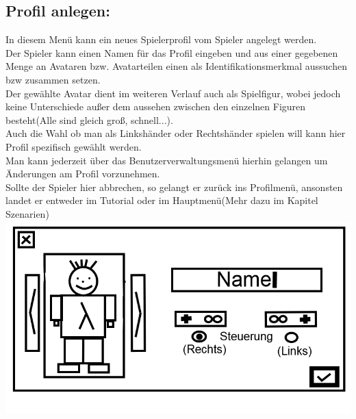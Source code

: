 \documentclass{scrartcl}
\begin{document}
\begin{enumerate}
	\begin{minipage}{1\textwidth}
		\item \subsection*{Profil anlegen:}
		In diesem Menü kann ein neues Spielerprofil vom Spieler angelegt werden.\\
		Der Spieler kann einen Namen für das Profil eingeben und aus einer gegebenen Menge an Avataren bzw. Avatarteilen einen als Identifikationsmerkmal aussuchen bzw zusammen setzen.\\
		Der gewählte Avatar dient im weiteren Verlauf auch als Spielfigur, wobei jedoch keine Unterschiede außer dem aussehen zwischen den einzelnen Figuren besteht(Alle sind gleich groß, schnell...).\\
		Auch die Wahl ob man als Linkshänder oder Rechtshänder spielen will kann hier Profil spezifisch gewählt werden.\\
		Man kann jederzeit über das Benutzerverwaltungsmenü hierhin gelangen um Änderungen am Profil vorzunehmen.\\
		Sollte der Spieler hier abbrechen, so gelangt er zurück ins Profilmenü, ansonsten landet er entweder im Tutorial oder im Hauptmenü(Mehr dazu im Kapitel Szenarien)\\
		\includegraphics[scale=0.5]{assets/CreateProfile2}
	\end{minipage}
	

\end{enumerate}
\end{document}
